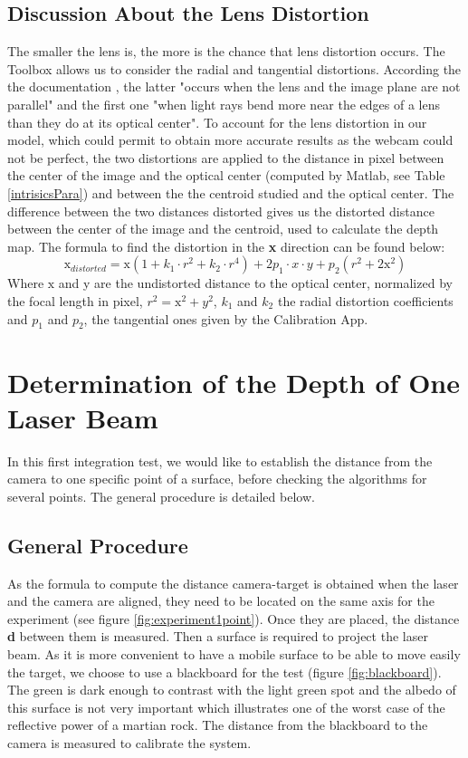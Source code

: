 \subsection{Discussion About the Lens Distortion}
The smaller the lens is, the more is the chance that lens distortion occurs. The Toolbox allows us to consider the radial and tangential distortions. According the the documentation \cite{matlabtoolbox}, the latter "occurs when the lens and the image plane are not parallel" and the first one "when light rays bend more near the edges of a lens than they do at its optical center". To account for the lens distortion in our model, which could permit to obtain more accurate results as the webcam could not be perfect, the two distortions are applied to the distance in pixel between the center of the image and the optical center (computed by Matlab, see Table \ref{intrisicsPara}) and between the the centroid studied and the optical center. The difference between the two distances distorted gives us the distorted distance between the center of the image and the centroid, used to calculate the depth map. The formula to find the distortion  in the \textbf{x} direction can be found below:
\begin{equation}
\text{x}_{distorted} = \text{x}(1 + k_1 \cdot r^2 + k_2 \cdot r^4) + 2p_1 \cdot x \cdot y + p_2(r^2 + 2\text{x}^2)
\end{equation}
Where $\text{x}$ and y are the undistorted distance to the optical center, normalized by the focal length in pixel, $r^2 = \text{x}^2 + y^2$, $k_1$ and $k_2$ the radial distortion coefficients and $p_1$ and $p_2$, the tangential ones given by the Calibration App.

\section{Determination of the Depth of One Laser Beam}
In this first integration test, we would like to establish the distance from the camera to one specific point of a surface, before checking the algorithms for several points. The general procedure is detailed below. 

\subsection{General Procedure}
As the formula to compute the distance camera-target is obtained when the laser and the camera are aligned, they need to be located on the same axis for the experiment (see figure \ref{fig:experiment1point}). Once they are placed, the distance \textbf{d} between them is measured. Then a surface is required to project the laser beam. As it is more convenient to have a mobile surface to be able to move easily the target, we choose to use a blackboard for the test (figure \ref{fig:blackboard}). The green is dark enough to contrast with the light green spot and the albedo of this surface is not very important which illustrates one of the worst case of the reflective power of a martian rock. The distance from the blackboard to the camera is measured to calibrate the system.


